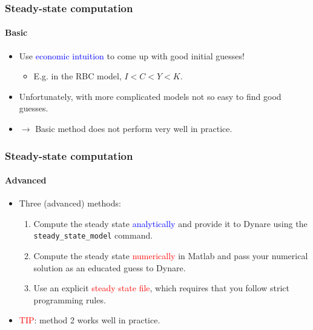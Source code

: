 \documentclass{beamer}
\begin{document}
\begin{frame}
\frametitle{Steady-state computation}
\framesubtitle{Basic}
\begin{itemize}
	\item Use \textcolor{blue}{economic intuition} to come up with good initial guesses!
	\begin{itemize}
		\item E.g. in the RBC model, $ I<C<Y<K $.
	\end{itemize}
    \pause 
	\item Unfortunately, with more complicated models not so easy to find good guesses. \item $ \rightarrow $ Basic method does not perform very well in practice.
\end{itemize}
\end{frame}

\begin{frame}
\frametitle{Steady-state computation}
\framesubtitle{Advanced}
\begin{itemize}
	\item Three (advanced) methods:
	\begin{enumerate}
		\item Compute the steady state \textcolor{blue}{analytically} and provide it to Dynare using
		the \texttt{steady\_state\_model} command.
		\pause
		\item Compute the steady state \textcolor{red}{numerically} in Matlab and pass your numerical solution as an educated guess to Dynare.
		\pause
		\item Use an explicit \textcolor{red}{steady state file}, which requires that you follow strict programming rules.
	\end{enumerate}
    \pause 
    \item \textcolor{red}{TIP}: method 2 works well in practice.
\end{itemize}
\end{frame}
\end{document}
